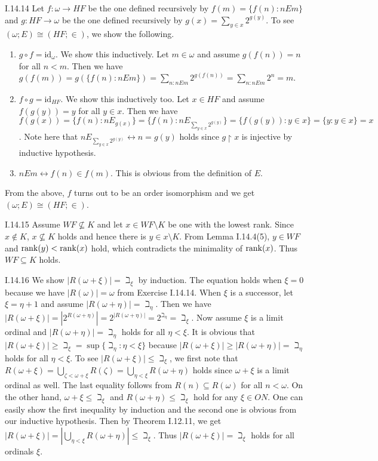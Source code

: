 \documentclass[12pt]{article}
\begin{document}
\begin{customthm}{I.14.14}
  Let $f:\omega\rightarrow HF$ be the one defined recursively by $f(m)=\{f(n):nEm\}$ and $g:HF\rightarrow\omega$ be the one defined recursively by $g(x)=\sum_{y\in x}2^{g(y)}$. To see $(\omega;E)\cong(HF;\in)$, we show the following.
  \begin{enumerate}
    \item\underline{$g\circ f = \mathrm{id}_\omega$}. We show this inductively. Let $m\in\omega$ and assume $g(f(n))=n$ for all $n<m$. Then we have $g(f(m))=g(\{f(n):nEm\})=\sum_{n:nEm}2^{g(f(n))}=\sum_{n:nEm}2^n=m$.
    \item\underline{$f\circ g = \mathrm{id}_{HF}$}. We show this inductively too. Let $x\in HF$ and assume $f(g(y))=y$ for all $y\in x$. Then we have $f(g(x))=\{f(n):nE_{g(x)}\}=\{f(n):nE_{\sum_{y\in x}2^{g(y)}}\}=\{f(g(y)):y\in x\}=\{y:y\in x\}=x$. Note here that $nE_{\sum_{y\in x}2^{g(y)}}\leftrightarrow n=g(y)$ holds since $g\upharpoonright x$ is injective by inductive hypothesis.
    \item\underline{$nEm\leftrightarrow f(n)\in f(m)$}. This is obvious from the definition of $E$.
  \end{enumerate}
  From the above, $f$ turns out to be an order isomorphism and we get $(\omega;E)\cong(HF;\in)$.
\end{customthm}

\begin{customthm}{I.14.15}
  Assume $WF\not\subseteq K$ and let $x\in WF\setminus K$ be one with the lowest rank. Since $x\not\in K$, $x\not\subseteq K$ holds and hence there is $y\in x\setminus K$. From Lemma I.14.4(5), $y\in WF$ and $\mathop{\mathrm{rank}}(y)<\mathop{\mathrm{rank}}(x)$ hold, which contradicts the minimality of $\mathop{\mathrm{rank}}(x)$. Thus $WF\subseteq K$ holds.
\end{customthm}

\begin{customthm}{I.14.16}
  We show $|R(\omega+\xi)|=\beth_\xi$ by induction. The equation holds when $\xi=0$ because we have $|R(\omega)|=\omega$ from Exercise I.14.14. When $\xi$ is a successor, let $\xi=\eta+1$ and assume $|R(\omega+\eta)|=\beth_\eta$. Then we have $|R(\omega+\xi)|=|2^{R(\omega+\eta)}|=2^{|R(\omega+\eta)|}=2^{\beth_\eta}=\beth_\xi$. Now assume $\xi$ is a limit ordinal and $|R(\omega+\eta)|=\beth_\eta$ holds for all $\eta<\xi$. It is obvious that $|R(\omega+\xi)|\geq\beth_\xi=\sup\{\beth_\eta:\eta<\xi\}$ because $|R(\omega+\xi)|\geq|R(\omega+\eta)|=\beth_\eta$ holds for all $\eta<\xi$. To see $|R(\omega+\xi)|\leq\beth_\xi$, we first note that $R(\omega+\xi)=\bigcup_{\zeta<\omega+\xi}R(\zeta)=\bigcup_{\eta<\xi}R(\omega+\eta)$ holds since $\omega+\xi$ is a limit ordinal as well. The last equality follows from $R(n)\subseteq R(\omega)$ for all $n<\omega$. On the other hand, $\omega+\xi\leq\beth_\xi$ and $R(\omega+\eta)\leq\beth_\xi$ hold for any $\xi\in ON$. One can easily show the first inequality by induction and the second one is obvious from our inductive hypothesis. Then by Theorem I.12.11, we get $|R(\omega+\xi)|=|\bigcup_{\eta<\xi}R(\omega+\eta)|\leq\beth_\xi$. Thus $|R(\omega+\xi)|=\beth_\xi$ holds for all ordinals $\xi$.
\end{customthm}
\end{document}

